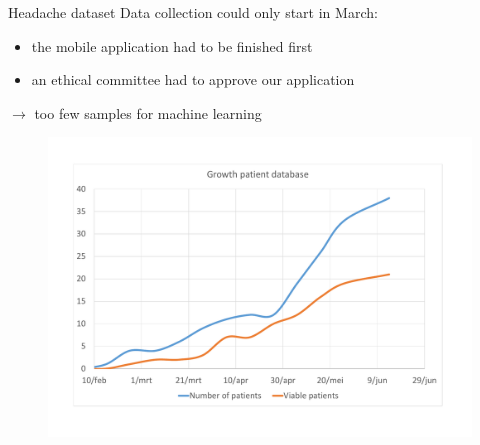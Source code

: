 \documentclass[english]{beamer}
\begin{document}
\begin{frame}{Headache dataset}
	Data collection could only start in March: \\
	\begin{itemize}
		\item the mobile application had to be finished first
		\item an ethical committee had to approve our application
	\end{itemize} \vspace{2em}
	$\rightarrow$ too few samples for machine learning
\end{frame}

\begin{frame}
	\begin{figure}
		\centering
			\includegraphics[width=\textwidth]{figures/chart_patients.pdf}
	\end{figure}

\end{frame}
\end{document}
